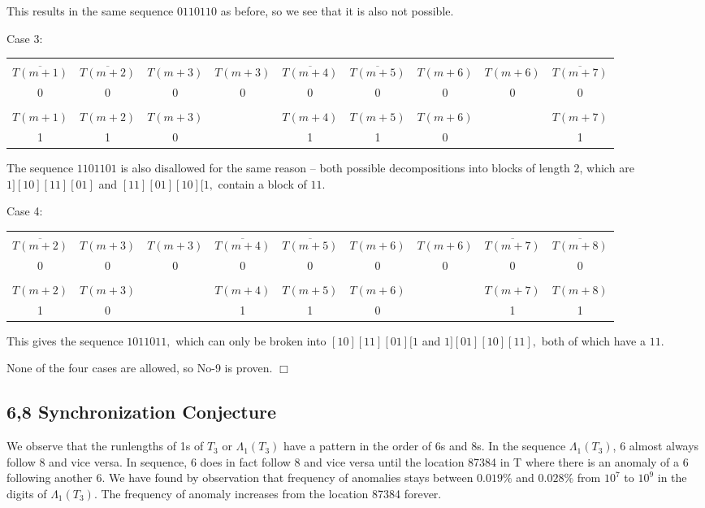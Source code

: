 \documentclass{article}
\begin{document}
This results in the same sequence $0110110$ as before, so we see that it is also not possible.

Case 3:

\begin{center}
\begin{tabular}{ |c|c|c|c|c|c|c|c|c| } 
 \hline
&&&&&&&&\\
$\overline{T(m+1)}$ & $\overline{T(m+2)}$ & $T(m+3)$ & $T(m+3)$ & $\overline{T(m+4)}$ & $\overline{T(m+5)}$ & $T(m+6)$ & $T(m+6)$ & $\overline{T(m+7)}$ \\ 
0 & 0 & 0 & 0 & 0 & 0 & 0 & 0 & 0 \\
\hline
&&&&&&&&\\
$T(m+1)$ & $T(m+2)$ & $T(m+3)$ & & $T(m+4)$ & $T(m+5)$ & $T(m+6)$ & & $T(m+7)$ \\
1 & 1 & 0 & & 1 & 1 & 0 & & 1 \\
 \hline
\end{tabular}
\end{center}

The sequence $1101101$ is also disallowed for the same reason -- both possible decompositions into blocks of length 2, which are $1][10][11][01]$ and $[11][01][10][1,$ contain a block of $11.$

Case 4:

\begin{center}
\begin{tabular}{ |c|c|c|c|c|c|c|c|c| } 
 \hline
&&&&&&&&\\
 $\overline{T(m+2)}$ & $T(m+3)$ & $T(m+3)$ & $\overline{T(m+4)}$ & $\overline{T(m+5)}$ & $T(m+6)$ & $T(m+6)$ & $\overline{T(m+7)}$ & $\overline{T(m+8)}$ \\ 
0 & 0 & 0 & 0 & 0 & 0 & 0 & 0 & 0 \\
\hline
&&&&&&&&\\
$T(m+2)$ & $T(m+3)$ & & $T(m+4)$ & $T(m+5)$ & $T(m+6)$ & & $T(m+7)$ & $T(m+8)$ \\
1 & 0 & & 1 & 1 & 0 & & 1 & 1 \\
 \hline
\end{tabular}
\end{center}

This gives the sequence $1011011,$ which can only be broken into $[10][11][01][1$ and $1][01][10][11],$ both of which have a $11.$

None of the four cases are allowed, so No-9 is proven. $\Box$

\subsection{6,8 Synchronization Conjecture}
We observe that the runlengths of 1s of $T_3$ or $\Lambda{_1(T_3)}$ have a pattern in the order of 6s and 8s. In the sequence $\Lambda{_1(T_3)}$, 6 almost always follow 8 and vice versa. In sequence, 6 does in fact follow 8 and vice versa until the location 87384 in T where there is an anomaly of a 6 following another 6. We have found by observation that frequency of anomalies stays between $0.019\%$ and $0.028\%$ from $10^7$ to $10^9$ in the digits of $\Lambda{_1(T_3)}$. The frequency of anomaly increases from the location 87384 forever.
\end{document}
